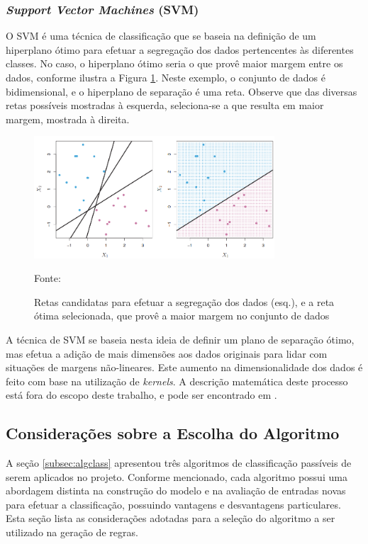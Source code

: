 \subsubsection{\textit{Support Vector Machines} (SVM)}
O SVM é uma técnica de classificação que se baseia na definição de um hiperplano ótimo para efetuar a segregação dos dados pertencentes às diferentes classes. No caso, o hiperplano ótimo seria o que provê maior margem entre os dados, conforme ilustra a Figura \ref{fig:svm_max_margin}. Neste exemplo, o conjunto de dados é bidimensional, e o hiperplano de separação é uma reta. Observe que das diversas retas possíveis mostradas à esquerda, seleciona-se a que resulta em maior margem, mostrada à direita.

\begin{figure}[h]
	\centering
	\caption{Retas candidatas para efetuar a segregação dos dados (esq.), e a reta ótima selecionada, que provê a maior margem no conjunto de dados}
  \includegraphics[width=0.8\textwidth]{imagens/svm_max_margin.png}
  \label{fig:svm_max_margin}  
  
  Fonte: \cite{james2014}
\end{figure}

A técnica de SVM se baseia nesta ideia de definir um plano de separação ótimo, mas efetua a adição de mais dimensões aos dados originais para lidar com situações de margens não-lineares. Este aumento na dimensionalidade dos dados é feito com base na utilização de \textit{kernels}. A descrição matemática deste processo está fora do escopo deste trabalho, e pode ser encontrado em \cite{james2014}.

\subsection{Considerações sobre a Escolha do Algoritmo}
A seção \ref{subsec:algclass} apresentou três algoritmos de classificação passíveis de serem aplicados no projeto. Conforme mencionado, cada algoritmo possui uma abordagem distinta na construção do modelo e na avaliação de entradas novas para efetuar a classificação, possuindo vantagens e desvantagens particulares. Esta seção lista as considerações adotadas para a seleção do algoritmo a ser utilizado na geração de regras.


